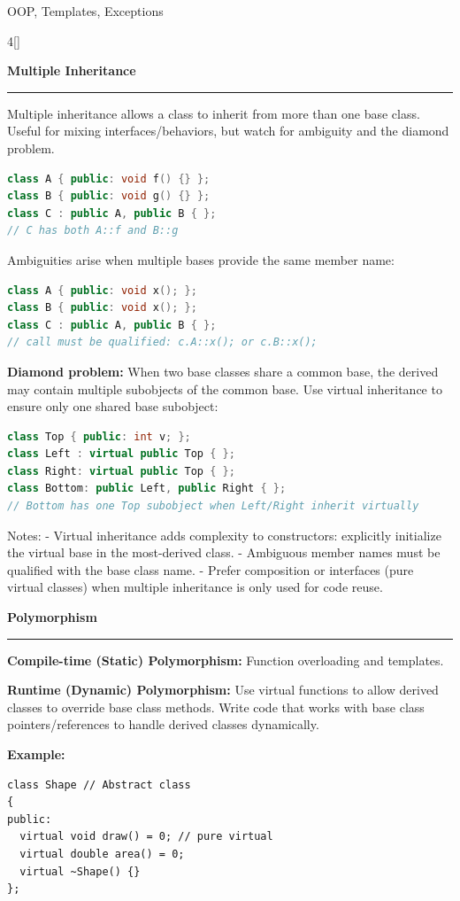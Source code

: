 \documentclass[final]{beamer}
\renewcommand{\subsection}[1]{%
  \par\vspace{1em}%
  {\noindent\large\bfseries #1\par}%
  \vspace{0.5em}\hrule\vspace{1em}%
}
\begin{document}
\begin{frame}[t,fragile]{OOP, Templates, Exceptions}
\begin{multicols}{4}[\setlength{\columnsep}{1.5cm}]
\subsection{Multiple Inheritance}
Multiple inheritance allows a class to inherit from more than one base class. Useful for mixing interfaces/behaviors, but watch for ambiguity and the diamond problem.

\begin{lstlisting}[language=C++]
class A { public: void f() {} };
class B { public: void g() {} };
class C : public A, public B { };
// C has both A::f and B::g
\end{lstlisting}

Ambiguities arise when multiple bases provide the same member name:
\begin{lstlisting}[language=C++]
class A { public: void x(); };
class B { public: void x(); };
class C : public A, public B { };
// call must be qualified: c.A::x(); or c.B::x();
\end{lstlisting}

	\textbf{Diamond problem:} When two base classes share a common base, the derived may contain multiple subobjects of the common base.
Use virtual inheritance to ensure only one shared base subobject:
\begin{lstlisting}[language=C++]
class Top { public: int v; };
class Left : virtual public Top { };
class Right: virtual public Top { };
class Bottom: public Left, public Right { };
// Bottom has one Top subobject when Left/Right inherit virtually
\end{lstlisting}

Notes:
- Virtual inheritance adds complexity to constructors: explicitly initialize the virtual base in the most-derived class.
- Ambiguous member names must be qualified with the base class name.
- Prefer composition or interfaces (pure virtual classes) when multiple inheritance is only used for code reuse.
 \subsection{Polymorphism}
\textbf{Compile-time (Static) Polymorphism:} Function overloading and templates.

\textbf{Runtime (Dynamic) Polymorphism:} Use virtual functions to allow derived classes to override base class methods. Write code that works with base class pointers/references to handle derived classes dynamically.

\textbf{Example:}
\begin{lstlisting}
class Shape // Abstract class
{
public:
  virtual void draw() = 0; // pure virtual
  virtual double area() = 0;
  virtual ~Shape() {}
};


\end{lstlisting}
\end{multicols}
\end{frame}
\end{document}
